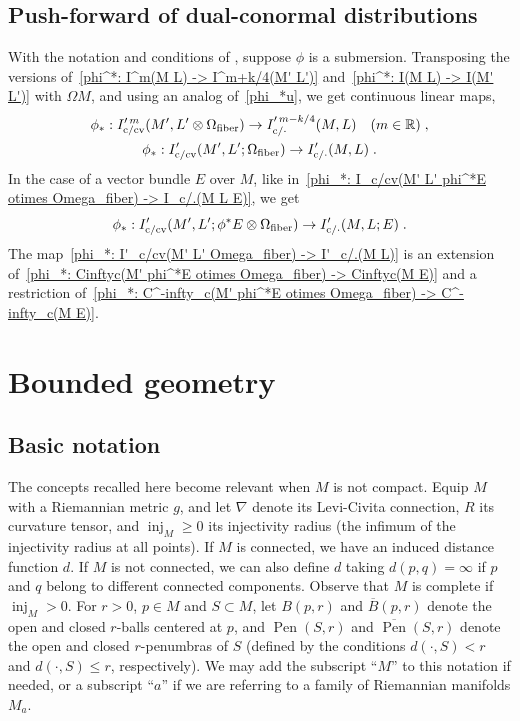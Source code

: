 \documentclass{memo-l}
\theoremstyle{plain}
\theoremstyle{definition}
\theoremstyle{remark}
\newcommand{\R}{\mathbb{R}}
\newcommand{\Pen}{\operatorname{Pen}}
\newcommand{\inj}{\operatorname{inj}}
\newcommand{\fiber}{{\text{\rm fiber}}}
\newcommand{\co}{{\text{\rm c}}}
\newcommand{\cv}{{\text{\rm cv}}}
\numberwithin{section}{chapter}
\numberwithin{equation}{section}%
\begin{document}
\subsection{Push-forward of dual-conormal distributions}
\label{ss: push-forward of dual-conormal distributions}

With the notation and conditions of , suppose $\phi$ is a submersion. Transposing the versions of~\eqref{phi^*: I^m(M L) -> I^m+k/4(M' L')} and~\eqref{phi^*: I(M L) -> I(M' L')} with $\Omega M$, and using an analog of~\eqref{phi_*u}, we get continuous linear maps,
\begin{gather}
\phi_*:I^{\prime\,m}_{\co/\cv}(M',L'\otimes\Omega_\fiber)\to I^{\prime\,m-k/4}_{\co/{\cdot}}(M,L)\quad(m\in\R)\;, \notag\\
\phi_*:I'_{\co/\cv}(M',L';\Omega_\fiber)\to I'_{\co/{\cdot}}(M,L)\;.
\label{phi_*: I'_c/cv(M' L' Omega_fiber) -> I'_c/.(M L)}
\end{gather}
In the case of a vector bundle $E$ over $M$, like in~\eqref{phi_*: I_c/cv(M' L' phi^*E otimes Omega_fiber) -> I_c/.(M L E)}, we get
\begin{equation}\label{phi_*: I'_c/cv(M' L' phi^*E otimes Omega_fiber) -> I'_c/.(M L E)}
\phi_*:I'_{\co/\cv}(M',L';\phi^*E\otimes\Omega_\fiber)\to I'_{\co/{\cdot}}(M,L;E)\;.
\end{equation}
The map~\eqref{phi_*: I'_c/cv(M' L' Omega_fiber) -> I'_c/.(M L)} is an extension of~\eqref{phi_*: Cinftyc(M' phi^*E otimes Omega_fiber) -> Cinftyc(M E)} and a restriction of~\eqref{phi_*: C^-infty_c(M' phi^*E otimes Omega_fiber) -> C^-infty_c(M E)}.



\section{Bounded geometry}\label{s: bd geom}

\subsection{Basic notation}\label{ss: bd geom - basic notation}

The concepts recalled here become relevant when $M$ is not compact. Equip $M$ with a Riemannian metric $g$, and let $\nabla$ denote its Levi-Civita connection, $R$ its curvature tensor, and $\inj_M\ge0$ its injectivity radius (the infimum of the injectivity radius at all points). If $M$ is connected, we have an induced distance function $d$. If $M$ is not connected, we can also define $d$ taking $d(p,q)=\infty$ if $p$ and $q$ belong to different connected components. Observe that $M$ is complete if $\inj_M>0$. For $r>0$, $p\in M$ and $S\subset M$, let $B(p,r)$ and $\overline B(p,r)$ denote the open and closed $r$-balls centered at $p$, and $\Pen(S,r)$ and $\overline{\Pen}(S,r)$ denote the open and closed $r$-penumbras of $S$ (defined by the conditions $d(\cdot,S)<r$ and $d(\cdot,S)\le r$, respectively). We may add the subscript ``$M$'' to this notation if needed, or a subscript ``$a$'' if we are referring to a family of Riemannian manifolds $M_a$.
\end{document}
